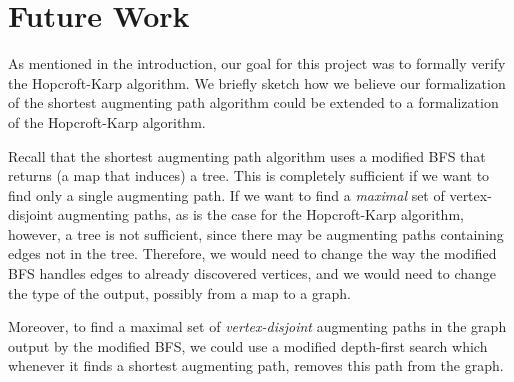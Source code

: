 \part{Future Work}
\label{ch:4}

As mentioned in the introduction, our goal for this project was to formally verify the Hopcroft-Karp algorithm. We briefly sketch how we believe our formalization of the shortest augmenting path algorithm could be extended to a formalization of the Hopcroft-Karp algorithm.

Recall that the shortest augmenting path algorithm uses a modified BFS that returns (a map that induces) a tree. This is completely sufficient if we want to find only a single augmenting path. If we want to find a \emph{maximal} set of vertex-disjoint augmenting paths, as is the case for the Hopcroft-Karp algorithm, however, a tree is not sufficient, since there may be augmenting paths containing edges not in the tree. Therefore, we would need to change the way the modified BFS handles edges to already discovered vertices, and we would need to change the type of the output, possibly from a map to a graph.

Moreover, to find a maximal set of \emph{vertex-disjoint} augmenting paths in the graph output by the modified BFS, we could use a modified depth-first search which whenever it finds a shortest augmenting path, removes this path from the graph.